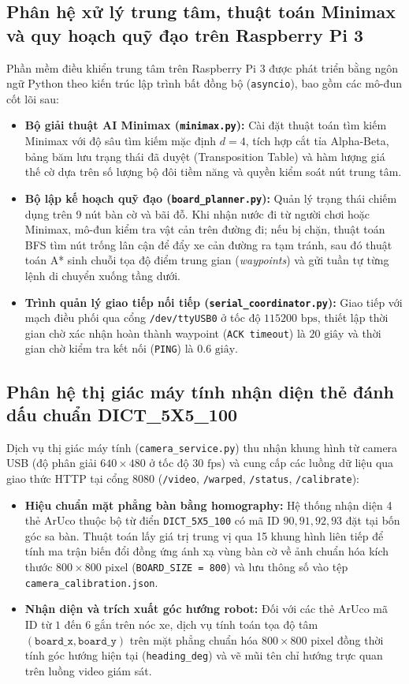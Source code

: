 \documentclass[12pt,a4paper]{report}
\begin{document}
	\subsection{Phân hệ xử lý trung tâm, thuật toán Minimax và quy hoạch quỹ đạo trên Raspberry Pi 3}
	Phần mềm điều khiển trung tâm trên Raspberry Pi 3 được phát triển bằng ngôn ngữ Python theo kiến trúc lập trình bất đồng bộ (\texttt{asyncio}), bao gồm các mô-đun cốt lõi sau:
	\begin{itemize}[leftmargin=1.2cm]
		\item \textbf{Bộ giải thuật AI Minimax (\texttt{minimax.py}):} Cài đặt thuật toán tìm kiếm Minimax với độ sâu tìm kiếm mặc định $d = 4$, tích hợp cắt tỉa Alpha-Beta, bảng băm lưu trạng thái đã duyệt (Transposition Table) và hàm lượng giá thế cờ dựa trên số lượng bộ đôi tiềm năng và quyền kiểm soát nút trung tâm.
		\item \textbf{Bộ lập kế hoạch quỹ đạo (\texttt{board\_planner.py}):} Quản lý trạng thái chiếm dụng trên 9 nút bàn cờ và bãi đỗ. Khi nhận nước đi từ người chơi hoặc Minimax, mô-đun kiểm tra vật cản trên đường đi; nếu bị chặn, thuật toán BFS tìm nút trống lân cận để đẩy xe cản đường ra tạm tránh, sau đó thuật toán A* sinh chuỗi tọa độ điểm trung gian (\textit{waypoints}) và gửi tuần tự từng lệnh di chuyển xuống tầng dưới.
		\item \textbf{Trình quản lý giao tiếp nối tiếp (\texttt{serial\_coordinator.py}):} Giao tiếp với mạch điều phối qua cổng \texttt{/dev/ttyUSB0} ở tốc độ $115200\text{ bps}$, thiết lập thời gian chờ xác nhận hoàn thành waypoint (\texttt{ACK timeout}) là $20\text{ giây}$ và thời gian chờ kiểm tra kết nối (\texttt{PING}) là $0.6\text{ giây}$.
	\end{itemize}
	
	\subsection{Phân hệ thị giác máy tính nhận diện thẻ đánh dấu chuẩn DICT\_5X5\_100}
	Dịch vụ thị giác máy tính (\texttt{camera\_service.py}) thu nhận khung hình từ camera USB (độ phân giải $640 \times 480$ ở tốc độ $30\text{ fps}$) và cung cấp các luồng dữ liệu qua giao thức HTTP tại cổng $8080$ (\texttt{/video}, \texttt{/warped}, \texttt{/status}, \texttt{/calibrate}):
	\begin{itemize}[leftmargin=1.2cm]
		\item \textbf{Hiệu chuẩn mặt phẳng bàn bằng homography:} Hệ thống nhận diện 4 thẻ ArUco thuộc bộ từ điển \texttt{DICT\_5X5\_100} có mã ID $90, 91, 92, 93$ đặt tại bốn góc sa bàn. Thuật toán lấy giá trị trung vị qua 15 khung hình liên tiếp để tính ma trận biến đổi đồng ứng ánh xạ vùng bàn cờ về ảnh chuẩn hóa kích thước $800 \times 800\text{ pixel}$ (\texttt{BOARD\_SIZE = 800}) và lưu thông số vào tệp \texttt{camera\_calibration.json}.
		\item \textbf{Nhận diện và trích xuất góc hướng robot:} Đối với các thẻ ArUco mã ID từ $1$ đến $6$ gắn trên nóc xe, dịch vụ tính toán tọa độ tâm $(\texttt{board\_x}, \texttt{board\_y})$ trên mặt phẳng chuẩn hóa $800 \times 800\text{ pixel}$ đồng thời tính góc hướng hiện tại (\texttt{heading\_deg}) và vẽ mũi tên chỉ hướng trực quan trên luồng video giám sát.
	\end{itemize}
	
\end{document}
